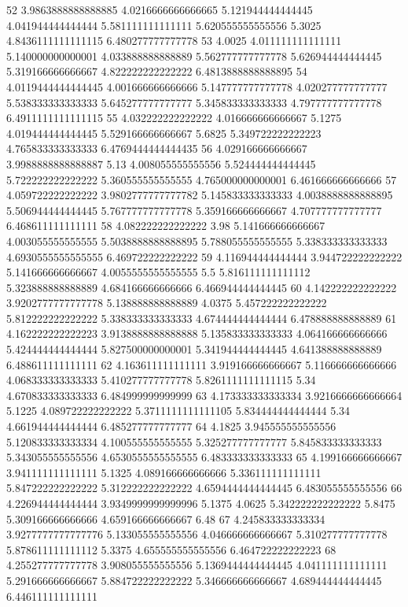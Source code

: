52 3.9863888888888885 4.0216666666666665 5.121944444444445 4.041944444444444 5.581111111111111 5.620555555555556 5.3025 4.8436111111111115 6.480277777777778
53 4.0025 4.011111111111111 5.140000000000001 4.033888888888889 5.562777777777778 5.626944444444445 5.319166666666667 4.822222222222222 6.4813888888888895
54 4.0119444444444445 4.001666666666666 5.147777777777778 4.020277777777777 5.538333333333333 5.645277777777777 5.345833333333333 4.797777777777778 6.4911111111111115
55 4.032222222222222 4.016666666666667 5.1275 4.019444444444445 5.529166666666667 5.6825 5.349722222222223 4.765833333333333 6.4769444444444435
56 4.029166666666667 3.9988888888888887 5.13 4.008055555555556 5.524444444444445 5.722222222222222 5.360555555555555 4.765000000000001 6.461666666666666
57 4.059722222222222 3.9802777777777782 5.145833333333333 4.0038888888888895 5.506944444444445 5.767777777777778 5.359166666666667 4.707777777777777 6.468611111111111
58 4.082222222222222 3.98 5.141666666666667 4.003055555555555 5.5038888888888895 5.788055555555555 5.338333333333333 4.6930555555555555 6.469722222222222
59 4.116944444444444 3.944722222222222 5.141666666666667 4.0055555555555555 5.5 5.816111111111112 5.323888888888889 4.684166666666666 6.466944444444445
60 4.142222222222222 3.9202777777777778 5.138888888888889 4.0375 5.457222222222222 5.812222222222222 5.338333333333333 4.674444444444444 6.478888888888889
61 4.162222222222223 3.9138888888888888 5.135833333333333 4.064166666666666 5.424444444444444 5.827500000000001 5.341944444444445 4.641388888888889 6.488611111111111
62 4.163611111111111 3.919166666666667 5.116666666666666 4.068333333333333 5.410277777777778 5.8261111111111115 5.34 4.670833333333333 6.484999999999999
63 4.173333333333334 3.9216666666666664 5.1225 4.089722222222222 5.3711111111111105 5.834444444444444 5.34 4.661944444444444 6.485277777777777
64 4.1825 3.945555555555556 5.120833333333334 4.100555555555555 5.325277777777777 5.845833333333333 5.343055555555556 4.6530555555555555 6.483333333333333
65 4.199166666666667 3.941111111111111 5.1325 4.089166666666666 5.336111111111111 5.847222222222222 5.312222222222222 4.6594444444444445 6.483055555555556
66 4.226944444444444 3.9349999999999996 5.1375 4.0625 5.342222222222222 5.8475 5.309166666666666 4.659166666666667 6.48
67 4.245833333333334 3.9277777777777776 5.133055555555556 4.046666666666667 5.310277777777778 5.878611111111112 5.3375 4.655555555555556 6.464722222222223
68 4.255277777777778 3.908055555555556 5.1369444444444445 4.041111111111111 5.291666666666667 5.884722222222222 5.346666666666667 4.689444444444445 6.446111111111111
